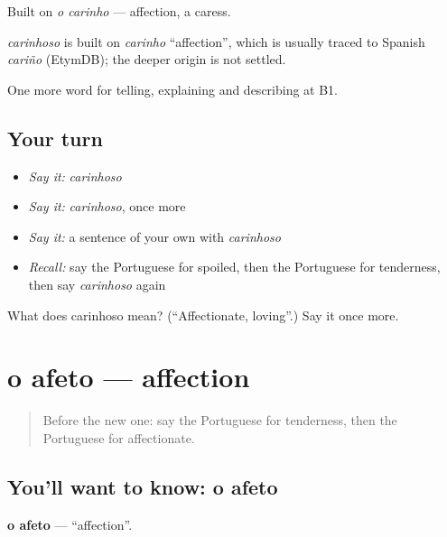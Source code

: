 Built on \emph{o carinho} — affection, a caress.

\begin{cousinweb}
\emph{carinhoso} is built on \emph{carinho} \textquotedblleft{}affection\textquotedblright{}, which is usually traced to Spanish \emph{cariño} (EtymDB); the deeper origin is not settled.
\end{cousinweb}

\begin{grammarlens}[title={What you've built}]
One more word for telling, explaining and describing at B1.
\end{grammarlens}

\subsection*{Your turn}
\begin{itemize}
\raggedright
  \item \emph{Say it:} \emph{carinhoso}
  \item \emph{Say it:} \emph{carinhoso}, once more
  \item \emph{Say it:} a sentence of your own with \emph{carinhoso}
  \item \emph{Recall:} say the Portuguese for spoiled, then the Portuguese for tenderness, then say \emph{carinhoso} again
\end{itemize}

\begin{tcolorbox}[breakable,colback=teal!4,colframe=teal!35!black,title={Before you move on}]
What does carinhoso mean? (\textquotedblleft{}Affectionate, loving\textquotedblright{}.) Say it once more.
\end{tcolorbox}
\section[o afeto]{o afeto — affection}

\label{lesson:PT-C496-afeto}



\begin{quote}
Before the new one: say the Portuguese for tenderness, then the Portuguese for affectionate.
\end{quote}

\subsection*{You'll want to know: o afeto}
\textbf{o afeto} — \textquotedblleft{}affection\textquotedblright{}.

